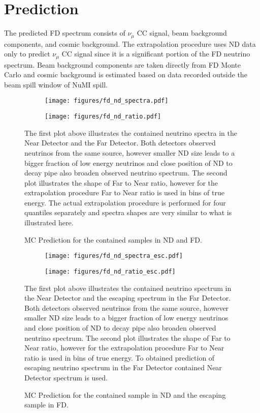 \section{Prediction}
The predicted FD spectrum consists of $\nu_\mu$ CC signal, beam background components, and cosmic background.
The extrapolation procedure uses ND data only to predict $\nu_\mu$ CC signal since it is a significant
portion of the FD neutrino spectrum. Beam background components are taken directly from FD Monte Carlo
and cosmic background is estimated based on data recorded outside the beam spill window of NuMI spill. 
\begin{figure}[th]
\centering
\begin{subfigure}[t]{0.95\textwidth}
  \centering
  \texttt{[image: figures/fd\_nd\_spectra.pdf]}
\end{subfigure}
\vspace{0.5cm}
\newline
\begin{subfigure}[t]{0.95\textwidth}
  \centering
  \texttt{[image: figures/fd\_nd\_ratio.pdf]}
\end{subfigure}
\caption{ MC Prediction for the contained samples in ND and FD. }
{ The first plot above illustrates the contained neutrino spectra in the Near Detector and the Far
Detector. Both detectors observed neutrinos from the same source, however smaller ND size leads to
a bigger fraction of low energy neutrinos and close position of ND to decay pipe also broaden observed
neutrino spectrum. The second plot illustrates the shape of Far to Near ratio, however for the extrapolation
procedure Far to Near ratio is used in bins of true energy. The actual extrapolation procedure is performed
for four quantiles separately and spectra shapes are very similar to what is illustrated here. }
\label{fig:ND_FD_shapes}
\end{figure}
\begin{figure}[th]
\centering
\begin{subfigure}[t]{0.95\textwidth}
  \centering
  \texttt{[image: figures/fd\_nd\_spectra\_esc.pdf]}
\end{subfigure}
\vspace{0.5cm}
\newline
\begin{subfigure}[t]{0.95\textwidth}
  \centering
  \texttt{[image: figures/fd\_nd\_ratio\_esc.pdf]}
\end{subfigure}
\caption{ MC Prediction for the contained sample in ND and the escaping sample in FD. }
{ The first plot above illustrates the contained neutrino spectrum in the Near Detector and the escaping spectrum
in the Far Detector. Both detectors observed neutrinos from the same source, however smaller ND size leads to
a bigger fraction of low energy neutrinos and close position of ND to decay pipe also broaden observed
neutrino spectrum. The second plot illustrates the shape of Far to Near ratio, however for the extrapolation
procedure Far to Near ratio is used in bins of true energy. To obtained prediction of escaping neutrino spectrum
in the Far Detector contained Near Detector spectrum is used. }
\label{fig:ND_FD_shapes_esc}
\end{figure}
